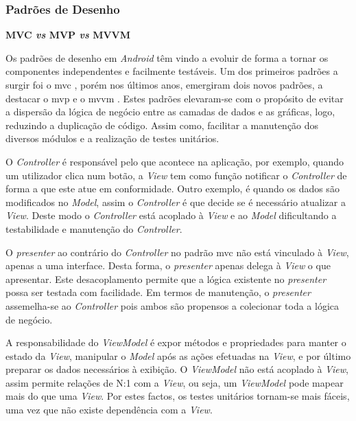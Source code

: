 \subsubsection{Padrões de Desenho}

\textbf{MVC \textit{vs} MVP \textit{vs} MVVM}

Os padrões de desenho em \textit{Android} têm vindo a evoluir de forma a tornar os componentes independentes e facilmente testáveis. Um dos primeiros padrões a surgir foi o \acrfull{mvc} \cite{mvc:online}, porém nos últimos anos, emergiram dois novos padrões, a destacar o \acrfull{mvp} \cite{mvp:online} e o \acrfull{mvvm} \cite{mvvm:online}. Estes padrões elevaram-se com o propósito de evitar a dispersão da lógica de negócio entre as camadas de dados e as gráficas, logo, reduzindo a duplicação de código. Assim como, facilitar a manutenção dos diversos módulos e a realização de testes unitários.

O \textit{Controller} é responsável pelo que acontece na aplicação, por exemplo, quando um utilizador clica num botão, a \textit{View} tem como função notificar o \textit{Controller} de forma a que este atue em conformidade. Outro exemplo, é quando os dados são modificados no \textit{Model}, assim o \textit{Controller} é que decide se é necessário atualizar a \textit{View}. Deste modo o \textit{Controller} está acoplado à \textit{View} e ao \textit{Model} dificultando a testabilidade e manutenção do \textit{Controller}.

O \textit{presenter} ao contrário do \textit{Controller} no padrão \acrshort{mvc} não está vinculado à \textit{View}, apenas a uma interface. Desta forma, o \textit{presenter} apenas delega à \textit{View} o que apresentar. Este desacoplamento permite que a lógica existente no \textit{presenter} possa ser testada com facilidade. Em termos de manutenção, o \textit{presenter} assemelha-se ao \textit{Controller} pois ambos são propensos a colecionar toda a lógica de negócio.

A responsabilidade do \textit{ViewModel} é expor métodos e propriedades para manter o estado da \textit{View}, manipular o \textit{Model} após as ações efetuadas na \textit{View}, e por último preparar os dados necessários à exibição. O \textit{ViewModel} não está acoplado à \textit{View}, assim permite relações de N:1 com a \textit{View}, ou seja, um \textit{ViewModel} pode mapear mais do que uma \textit{View}. Por estes factos, os testes unitários tornam-se mais fáceis, uma vez que não existe dependência com a \textit{View}.

